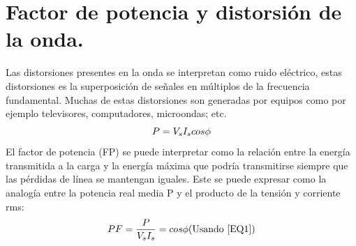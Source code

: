 \section{Factor de potencia y distorsión de la onda.}
Las distorsiones presentes en la onda se interpretan como ruido eléctrico, estas distorsiones es la superposición de señales en múltiplos de la frecuencia fundamental. Muchas de estas distorsiones son generadas por equipos como por ejemplo televisores, computadores, microondas; etc.\\
\begin{equation}\label{EQ1}
P=V_{s}I_{s}cos \phi\\
\end{equation}
El factor de potencia (FP) se puede interpretar como la relación entre la energía transmitida a la carga y la energía máxima que podría transmitirse siempre que las pérdidas de línea se mantengan iguales. \cite{A30} Este se puede expresar como la analogía entre la potencia real media P y el producto de la tensión y corriente rms:\\
\begin{equation}\label{EQ2}
PF=\frac{P}{V_{s}I_{s}}=cos\phi\\
$(Usando \ref{EQ1})$  \\
\end{equation} 

